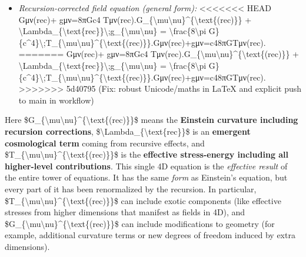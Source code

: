 \documentclass[]{article}
\begin{document}
\begin{itemize}
\item
  \emph{Recursion-corrected field equation (general form):}
<<<<<<< HEAD
  Gμν(rec)+\Lambdarec  gμν=8πGc4  Tμν(rec).G\_\{\textbackslash mu\textbackslash nu\}\^{}\{\textbackslash text\{(rec)\}\}
  +
  \textbackslash Lambda\_\{\textbackslash text\{rec\}\}\textbackslash;g\_\{\textbackslash mu\textbackslash nu\}
  = \textbackslash frac\{8\textbackslash pi
  G\}\{c\^{}4\}\textbackslash;T\_\{\textbackslash mu\textbackslash nu\}\^{}\{\textbackslash text\{(rec)\}\}.Gμν(rec)\hspace{0pt}+\Lambdarec\hspace{0pt}gμν\hspace{0pt}=c48πG\hspace{0pt}Tμν(rec)\hspace{0pt}.
=======
  Gμν(rec)+\Lambdarec  gμν=8πGc4  Tμν(rec).G\_\{\textbackslash{}mu\textbackslash{}nu\}\^{}\{\textbackslash{}text\{(rec)\}\}
  +
  \textbackslash{}Lambda\_\{\textbackslash{}text\{rec\}\}\textbackslash{};g\_\{\textbackslash{}mu\textbackslash{}nu\}
  = \textbackslash{}frac\{8\textbackslash{}pi
  G\}\{c\^{}4\}\textbackslash{};T\_\{\textbackslash{}mu\textbackslash{}nu\}\^{}\{\textbackslash{}text\{(rec)\}\}.Gμν(rec)​+\Lambdarec​gμν​=c48πG​Tμν(rec)​.
>>>>>>> 5d40795 (Fix: robust Unicode/maths in LaTeX and explicit push to main in workflow)
\end{itemize}

Here
\$G\_\{\textbackslash{}mu\textbackslash{}nu\}\^{}\{\textbackslash{}text\{(rec)\}\}\$
means the \textbf{Einstein curvature including recursion corrections},
\$\textbackslash{}Lambda\_\{\textbackslash{}text\{rec\}\}\$ is an
\textbf{emergent cosmological term} coming from recursive effects, and
\$T\_\{\textbackslash{}mu\textbackslash{}nu\}\^{}\{\textbackslash{}text\{(rec)\}\}\$
is the \textbf{effective stress-energy including all higher-level
contributions}​. This single 4D equation is the \emph{effective result}
of the entire tower of equations. It has the same \emph{form} as
Einstein's equation, but every part of it has been renormalized by the
recursion. In particular,
\$T\_\{\textbackslash{}mu\textbackslash{}nu\}\^{}\{\textbackslash{}text\{(rec)\}\}\$
can include exotic components (like effective stresses from higher
dimensions that manifest as fields in 4D), and
\$G\_\{\textbackslash{}mu\textbackslash{}nu\}\^{}\{\textbackslash{}text\{(rec)\}\}\$
can include modifications to geometry (for example, additional curvature
terms or new degrees of freedom induced by extra dimensions).
\end{document}
